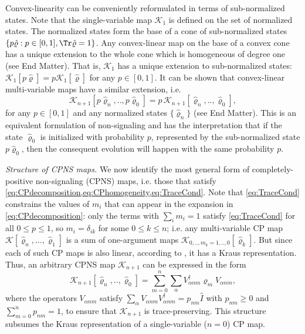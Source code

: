 \documentclass[
    11pt,
    letterpaper,
    reprint,
    notitlepage,
    superscriptaddress,
    aps,prx
]{revtex4-2}
\renewcommand{\rho}{\varrho}
\newcommand{\K}{\mathcal{K}}
\begin{document}
Convex-linearity can be conveniently reformulated in terms of sub-normalized states.
Note that the single-variable map $\K_1$ is defined on the set of normalized states.
The normalized states form the base of a cone of sub-normalized
states $\{p \hat{\rho} : p \in [0,1], \Tr \hat{\rho}=1\}$.
Any convex-linear map on the base of a convex cone has a unique extension 
to the whole cone which is homogeneous of degree one (see End Matter).
That is, $\K_1$ has a unique extension to sub-normalized states: 
$\K_1[p\hat{\rho}] = p \K_1[\hat{\rho}]$ for any $p\in[0,1]$. 
It can be shown that convex-linear multi-variable maps have a similar extension, i.e.
\begin{equation}\label{eq:TraceCond}
	\K_{n+1}[p \hat \rho_n, .., p \hat \rho_0] = p \, \K_{n+1}[\hat \rho_n, .., \hat \rho_0],
\end{equation}
for any $p\in [0,1]$ and any normalized states $\{\hat\rho_n\}$ (see End Matter).
This is an equivalent formulation of non-signaling and has the interpretation that
if the state $\hat \rho_0$ is initialized with probability $p$, represented by the sub-normalized
state $p \hat \rho_0$, then the consequent evolution will happen with the same probability $p$.

\emph{Structure of CPNS maps.}
We now identify the most general form of completely-positive non-signaling (CPNS) maps,
i.e. those that satisfy \cref{eq:CPdecomposition,eq:CPhomogeneity,eq:TraceCond}.
Note that \cref{eq:TraceCond} constrains the values of $m_i$ that can appear in the expansion
in \cref{eq:CPdecomposition}:
only the terms with $\sum_i m_i = 1$ satisfy \cref{eq:TraceCond} for all $0 \leq p \leq 1$, so 
$m_{i} = \delta_{ik} $ for some $0 \leq k \leq n$; i.e. any multi-variable CP 
map $\K[\hat \rho_n, \ldots, \hat \rho_1]$ is a sum of one-argument maps $\K_{0,.., m_k = 1, ..,0}[\hat \rho_k]$. 
But since each of such CP maps is also linear, according to \cite{AndChoi86}, it has a Kraus representation. 
Thus, an arbitrary CPNS map $\K_{n+1}$ can be expressed in the form
\begin{equation}\label{eq:NonMarkKraus}
    \mathcal{K}_{n+1}[\hat \rho_n, .., \hat \rho_0] = 
	\sum_{m=0}^n \sum_\alpha V^\dagger_{\alpha n m} \hat \rho_m V_{\alpha n m},
\end{equation}
where the operators $V_{\alpha nm}$ satisfy
$\sum_\alpha V_{\alpha nm} V^\dagger_{\alpha nm} = p_{nm} \hat I$ with 
$p_{nm} \geq 0$ and $\sum_{m=0}^n p_{nm} = 1$, 
to ensure that $\mathcal{K}_{n+1}$ is trace-preserving.
This structure subsumes the Kraus representation of a single-variable ($n=0$) 
CP map.
\end{document}
